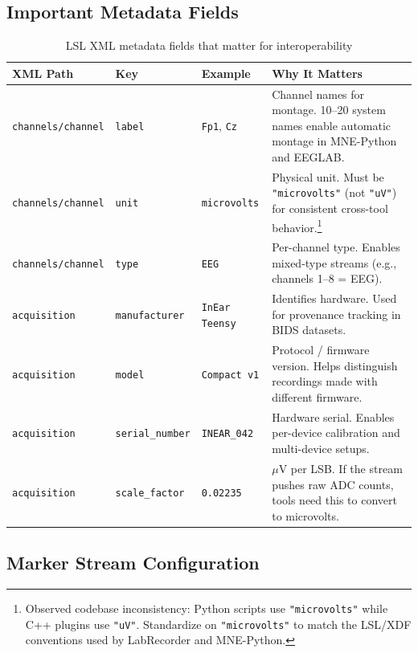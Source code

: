 \documentclass[11pt,a4paper]{article}
\begin{document}
\subsection{Important Metadata Fields}

\begin{table}[H]
\centering
\caption{LSL XML metadata fields that matter for interoperability}
\label{tab:lsl-xml-fields}
\small
\begin{tabularx}{\textwidth}{|l|l|l|>{\raggedright\arraybackslash}X|}
\hline
\textbf{XML Path} & \textbf{Key} & \textbf{Example} & \textbf{Why It Matters} \\\hline
\hline
\texttt{channels/channel} & \texttt{label} & \texttt{Fp1}, \texttt{Cz} &
Channel names for montage.  10--20 system names enable automatic montage in MNE-Python and EEGLAB. \\
\hline
\texttt{channels/channel} & \texttt{unit} & \texttt{microvolts} &
Physical unit.  Must be \texttt{"microvolts"} (not \texttt{"uV"}) for consistent cross-tool behavior.\footnote{Observed codebase inconsistency: Python scripts use \texttt{"microvolts"} while C++ plugins use \texttt{"uV"}.  Standardize on \texttt{"microvolts"} to match the LSL/XDF conventions used by LabRecorder and MNE-Python.} \\
\hline
\texttt{channels/channel} & \texttt{type} & \texttt{EEG} &
Per-channel type.  Enables mixed-type streams (e.g., channels 1--8 = EEG). \\
\hline
\texttt{acquisition} & \texttt{manufacturer} & \texttt{InEar Teensy} &
Identifies hardware.  Used for provenance tracking in BIDS datasets. \\
\hline
\texttt{acquisition} & \texttt{model} & \texttt{Compact v1} &
Protocol / firmware version.  Helps distinguish recordings made with different firmware. \\
\hline
\texttt{acquisition} & \texttt{serial\_number} & \texttt{INEAR\_042} &
Hardware serial.  Enables per-device calibration and multi-device setups. \\
\hline
\texttt{acquisition} & \texttt{scale\_factor} & \texttt{0.02235} &
$\mu$V per LSB.  If the stream pushes raw ADC counts, tools need this to convert to microvolts. \\
\hline
\end{tabularx}
\end{table}

\subsection{Marker Stream Configuration}
\end{document}
